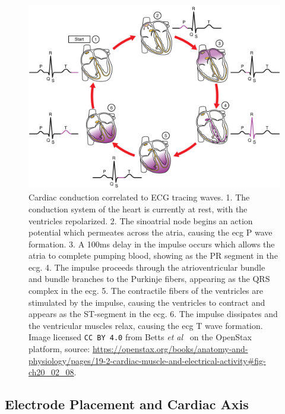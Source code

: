 \documentclass[\main/thesis.tex]{subfiles}
\begin{document}
\begin{figure}[hb]
    \centering
    \includegraphics[width=14cm]{figure/pqrst_with_heart_conduction_system.jpeg}
    \caption[Cardiac conduction correlated to ECG tracing waves.]{Cardiac conduction correlated to ECG tracing waves.
    1. The conduction system of the heart is currently at rest, with the ventricles repolarized.
    2. The sinoatrial node begins an action potential which permeates across the atria, causing the \gls{ecg} P wave formation.
    3. A 100ms delay in the impulse occurs which allows the atria to complete pumping blood, showing as the PR segment in the \gls{ecg}.
    4. The impulse proceeds through the atrioventricular bundle and bundle branches to the Purkinje fibers, appearing as the QRS complex in the \gls{ecg}.
    5. The contractile fibers of the ventricles are stimulated by the impulse, causing the ventricles to contract and appears as the ST-segment in the \gls{ecg}.
    6. The impulse dissipates and the ventricular muscles relax, causing the \gls{ecg} T wave formation.
    Image licensed \texttt{CC BY 4.0} from Betts \emph{et al}~\cite{betts-anatomy-and-physiology} on the OpenStax platform, source: \url{https://openstax.org/books/anatomy-and-physiology/pages/19-2-cardiac-muscle-and-electrical-activity\#fig-ch20_02_08}.}
    \label{fig:pqrst_heart_conduction_system}
\end{figure}

\subsection{Electrode Placement and Cardiac Axis}
\end{document}
